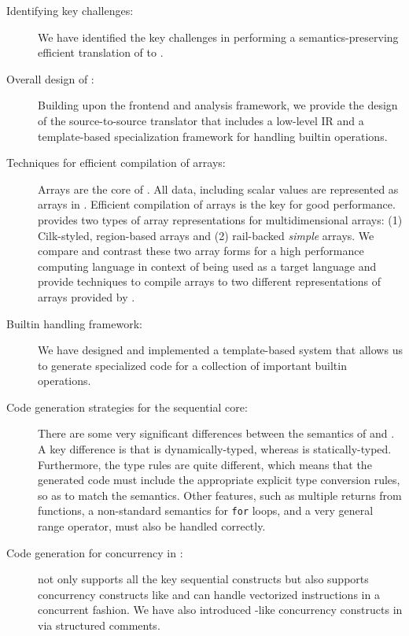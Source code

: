 \begin{description}

\item[Identifying key challenges:] We have identified the key challenges
in performing a semantics-preserving efficient translation of \matlab to \xten.

\item[Overall design of \mixten:] Building upon the \mclab frontend and analysis
framework, we provide the design of the \mixten
source-to-source translator that includes a low-level \xten IR and a
template-based specialization framework for handling builtin operations.

\item[Techniques for efficient compilation of \matlab arrays:] Arrays are
the core of \matlab. All data, including scalar values are represented
as arrays in \matlab. Efficient compilation of arrays is the key for
good performance. \xten provides two
types of array representations for multidimensional arrays: (1)
Cilk-styled, region-based arrays and (2) rail-backed \emph{simple} arrays. 
We compare
and contrast these two array forms for a high performance computing
language in context of being used as a target language and provide techniques
to compile \matlab arrays to two different representations of arrays provided
by \xten.

\item[Builtin handling framework:] We have designed and implemented a
template-based system that allows us to generate specialized \xten code for a
collection of important \matlab builtin operations.

\item[Code generation strategies for the sequential core:]  There
are some very significant differences between the semantics of \matlab
and \xten.  A key difference is that \matlab is dynamically-typed,
whereas \xten is statically-typed.   Furthermore, the type rules are
quite different, which means that the generated \xten code must include
the appropriate explicit type conversion rules, so as to match the
\matlab semantics.   Other \matlab features, such as multiple returns
from functions, a non-standard semantics for \texttt{for} loops, and a
very general range operator, must also be handled correctly.

\item[Code generation for concurrency in \matlab:] \mixten not only supports all
the key sequential constructs but also supports concurrency constructs like
\parfor and can handle vectorized instructions in a concurrent fashion. We have
also introduced \xten-like concurrency constructs in \matlab via structured
comments.


\end{description}
